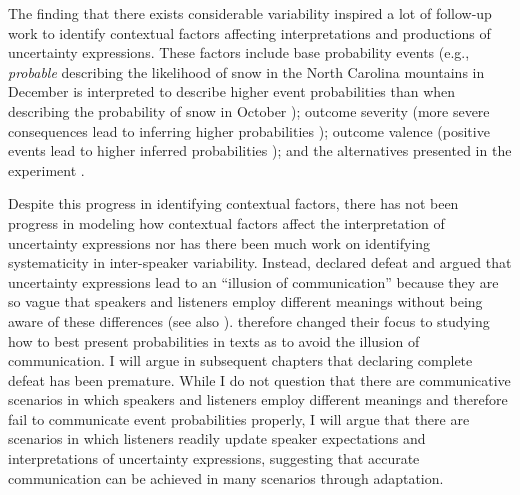 The finding that there exists considerable variability inspired a lot of follow-up work to identify contextual factors
affecting interpretations and productions of uncertainty expressions. These factors include base probability events (e.g.,
\textit{probable} describing the likelihood of snow in the North Carolina mountains in December is interpreted to describe
higher event probabilities than when describing the probability of snow in October \cite{WallstenFillenbaumandCox1986}); 
outcome severity (more severe consequences lead to inferring higher probabilities \cite{WeberHilton1990}); outcome valence
(positive events lead to higher inferred probabilities \cite{MulletRivet1991}); and the alternatives presented in the experiment 
\cite{Filenbaumetal1991}.

Despite this progress in identifying contextual factors, there has not been progress in modeling how contextual factors
affect the interpretation of uncertainty expressions nor has there been much work on identifying systematicity in
inter-speaker variability. Instead, \cite{Budescuetal2009} declared defeat and argued that uncertainty expressions
lead to an ``illusion of communication'' because they are so vague that speakers and listeners employ different meanings
without being aware of these differences (see also \cite{AmerHackenbrackNelson1994,BrunTeigen1998,TeigenBrun1999}).
 \cite{Budescuetal2009} therefore changed their focus to studying how to best present probabilities in texts as to avoid the illusion 
 of communication. I will argue in subsequent chapters that declaring complete defeat has been premature. While I do not question
 that there are communicative scenarios in which speakers and listeners employ different meanings and therefore
 fail to communicate event probabilities properly, I will argue that there are scenarios in which listeners readily update speaker
 expectations and interpretations of uncertainty expressions, suggesting that accurate communication can be achieved in many
 scenarios through adaptation.
  

